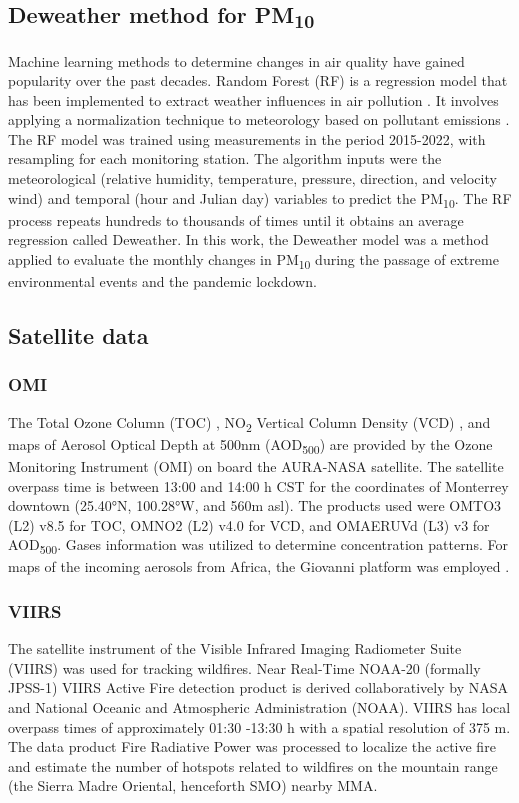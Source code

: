 \documentclass[sn-mathphys-num]{sn-jnl}
\begin{document}
\subsection{Deweather method for PM\textsubscript{10}}
Machine learning methods to determine changes in air quality have gained popularity over the past decades. Random Forest (RF) is a regression model that has been implemented to extract weather influences in air pollution \citep{Breiman_2001,Vu_2019,Cole_2020}. It involves applying a normalization technique to meteorology based on pollutant emissions \citep{Stuart_2019,Zongbo_2021,Lv_2022}. The RF model was trained using measurements in the period 2015-2022, with resampling for each monitoring station. The algorithm inputs were the meteorological (relative humidity, temperature, pressure, direction, and velocity wind) and temporal (hour and Julian day) variables to predict the PM\textsubscript{10}. The RF process repeats hundreds to thousands of times until it obtains an average regression called Deweather. In this work, the Deweather model was a method applied to evaluate the monthly changes in PM\textsubscript{10} during the passage of extreme environmental events and the pandemic lockdown.
\subsection{Satellite data}
\subsubsection{OMI}
The Total Ozone Column (TOC) \citep{dcio}, NO\textsubscript{2} Vertical Column Density (VCD) \citep{Lamsal_2020}, and maps of Aerosol Optical Depth at 500nm (AOD\textsubscript{500}) are provided by the Ozone Monitoring Instrument (OMI) on board the AURA-NASA satellite. The satellite overpass time is between 13:00 and 14:00 h CST for the coordinates of Monterrey downtown (25.40°N, 100.28°W, and 560m asl). The products used were OMTO3 (L2) v8.5 for TOC, OMNO2 (L2) v4.0 for VCD, and OMAERUVd (L3) v3 for AOD\textsubscript{500}. Gases information was utilized to determine concentration patterns. For maps of the incoming aerosols from Africa, the Giovanni platform was employed \citep{torres2008}.
\subsubsection{VIIRS}
The satellite instrument of the Visible Infrared Imaging Radiometer Suite (VIIRS) \citep{Schroeder_2014} was used for tracking wildfires. Near Real-Time NOAA-20 (formally JPSS-1) VIIRS Active Fire detection product is derived collaboratively by NASA and National Oceanic and Atmospheric Administration (NOAA). VIIRS has local overpass times of approximately 01:30 -13:30 h with a spatial resolution of 375 m. The data product Fire Radiative Power \citep{earthdata} was processed to localize the active fire and estimate the number of hotspots related to wildfires on the mountain range (the Sierra Madre Oriental, henceforth SMO) nearby MMA.
\end{document}

